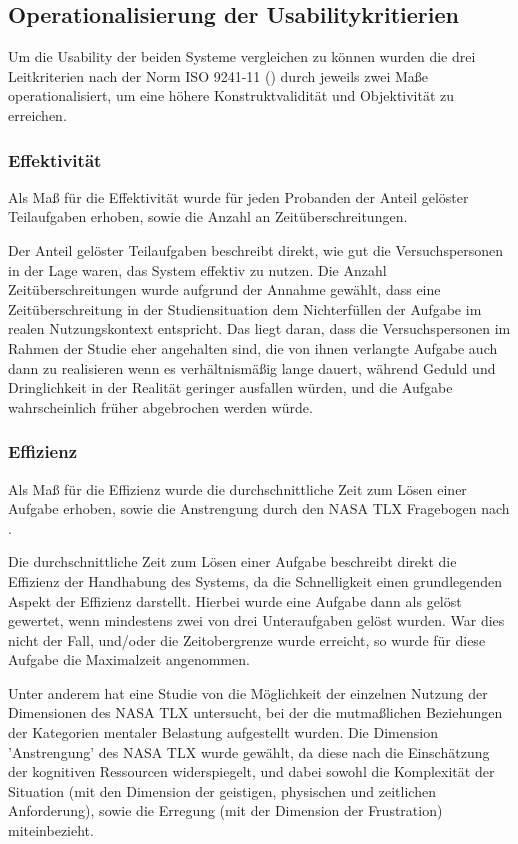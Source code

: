 \subsection{Operationalisierung der Usabilitykritierien}

Um die Usability der beiden Systeme vergleichen zu können wurden die drei Leitkriterien nach der Norm ISO 9241-11 (\cite{iso}) durch jeweils zwei Maße operationalisiert, um eine höhere Konstruktvalidität und Objektivität zu erreichen.\\


\subsubsection{Effektivität}
Als Maß für die Effektivität wurde für jeden Probanden der Anteil gelöster Teilaufgaben erhoben, sowie die Anzahl an Zeitüberschreitungen. 

Der Anteil gelöster Teilaufgaben beschreibt direkt, wie gut die Versuchspersonen in der Lage waren, das System effektiv zu nutzen. Die Anzahl Zeitüberschreitungen wurde aufgrund der Annahme gewählt, dass eine Zeitüberschreitung in der Studiensituation dem Nichterfüllen der Aufgabe im realen Nutzungskontext entspricht. Das liegt daran, dass die Versuchspersonen im Rahmen der Studie eher angehalten sind, die von ihnen verlangte Aufgabe auch dann zu realisieren wenn es verhältnismäßig lange dauert, während Geduld und Dringlichkeit in der Realität geringer ausfallen würden, und die Aufgabe wahrscheinlich früher abgebrochen werden würde.




\subsubsection{Effizienz} 
Als Maß für die Effizienz wurde die durchschnittliche Zeit zum Lösen einer Aufgabe erhoben, sowie die Anstrengung durch den NASA TLX Fragebogen nach \cite{hart1988development}.

Die durchschnittliche Zeit zum Lösen einer Aufgabe beschreibt direkt die Effizienz der Handhabung des Systems, da die Schnelligkeit einen grundlegenden Aspekt der Effizienz darstellt. Hierbei wurde eine Aufgabe dann als gelöst gewertet, wenn mindestens zwei von drei Unteraufgaben gelöst wurden. War dies nicht der Fall, und/oder die Zeitobergrenze wurde erreicht, so wurde für diese Aufgabe die Maximalzeit angenommen.

Unter anderem  hat eine Studie von \cite{galy2018measuring} die Möglichkeit der einzelnen Nutzung der Dimensionen des NASA TLX untersucht, bei der die mutmaßlichen Beziehungen der Kategorien mentaler Belastung aufgestellt wurden. Die Dimension 'Anstrengung' des NASA TLX wurde gewählt, da diese nach \cite{galy2018measuring} die Einschätzung der kognitiven Ressourcen widerspiegelt, und dabei sowohl die Komplexität der Situation (mit den Dimension der geistigen, physischen und zeitlichen Anforderung), sowie die Erregung (mit der Dimension der Frustration) miteinbezieht.




